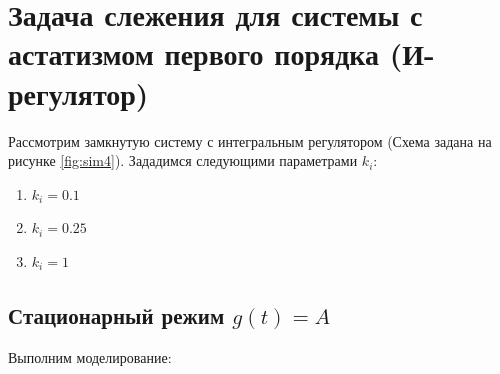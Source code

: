 \chapter{Задача слежения для системы с астатизмом первого порядка
(И-регулятор)}
Рассмотрим замкнутую систему с интегральным регулятором (Схема задана на рисунке
\hyperref[fig:sim4]{\ref{fig:sim4}}). Зададимся следующими параметрами $k_i$:
\begin{enumerate}
    \item $k_i = 0.1$
    \item $k_i = 0.25$ 
    \item $k_i = 1$
\end{enumerate}
\section{Стационарный режим $g(t) = A$}
Выполним моделирование:
